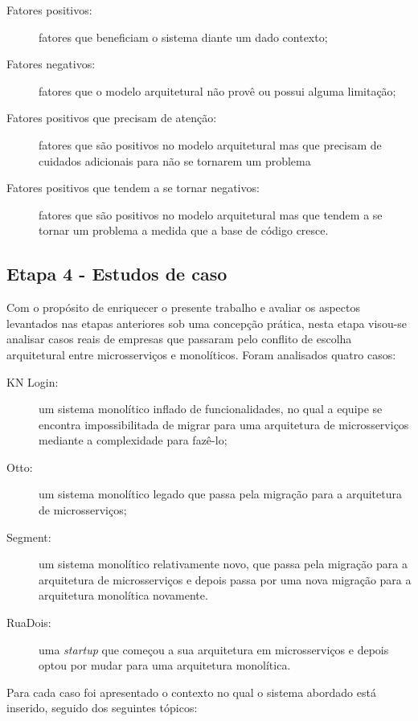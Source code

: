 \begin{description}
    \item[Fatores positivos:] fatores que beneficiam o sistema diante um dado contexto;
    \item[Fatores negativos:] fatores que o modelo arquitetural não provê ou possui alguma limitação;
    \item[Fatores positivos que precisam de atenção:] fatores que são positivos no modelo
        arquitetural mas que precisam de cuidados adicionais para não se tornarem um problema
    \item[Fatores positivos que tendem a se tornar negativos:] fatores que são positivos no modelo
        arquitetural mas que tendem a se tornar um problema a medida que a base de código cresce.
\end{description}

\subsection{Etapa 4 - Estudos de caso}

Com o propósito de enriquecer o presente trabalho e avaliar os aspectos levantados nas etapas
anteriores sob uma concepção prática, nesta etapa visou-se analisar casos reais de empresas que
passaram pelo conflito de escolha arquitetural entre microsserviços e monolíticos. Foram analisados
quatro casos:

\begin{description}
    \item[KN Login:] um sistema monolítico inflado de funcionalidades, no qual a equipe se encontra
        impossibilitada de migrar para uma arquitetura de microsserviços mediante a complexidade
        para fazê-lo;
    \item[Otto:] um sistema monolítico legado que passa pela migração para a arquitetura de
        microsserviços;
    \item[Segment:] um sistema monolítico relativamente novo, que passa pela migração para a
        arquitetura de microsserviços e depois passa por uma nova migração para a arquitetura
        monolítica novamente.
    \item[RuaDois:] uma \textit{startup} que começou a sua arquitetura em microsserviços e depois
        optou por mudar para uma arquitetura monolítica.
\end{description}

Para cada caso foi apresentado o contexto no qual o sistema abordado está inserido, seguido dos
seguintes tópicos:

